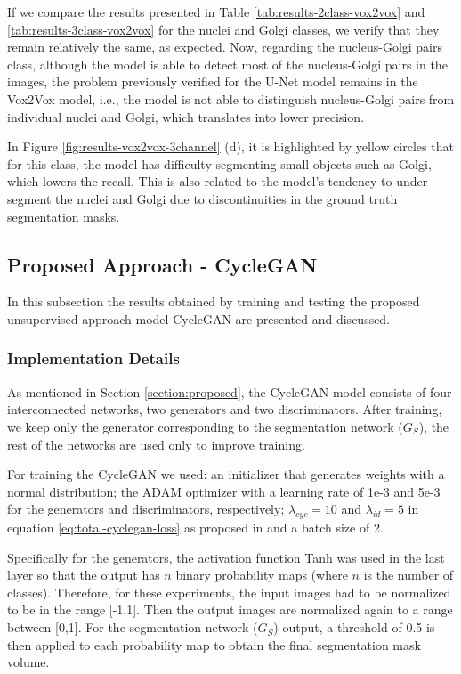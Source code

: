 If we compare the results presented in Table \ref{tab:results-2class-vox2vox} and \ref{tab:results-3class-vox2vox} for the nuclei and Golgi classes, we verify that they remain relatively the same, as expected. Now, regarding the nucleus-Golgi pairs class, although the model is able to detect most of the nucleus-Golgi pairs in the images, the problem previously verified for the U-Net model remains in the Vox2Vox model, i.e., the model is not able to distinguish nucleus-Golgi pairs from individual nuclei and Golgi, which translates into lower precision. 

In Figure \ref{fig:results-vox2vox-3channel} (d), it is highlighted by yellow circles that for this class, the model has difficulty segmenting small objects such as Golgi, which lowers the recall. This is also related to the model's tendency to under-segment the nuclei and Golgi due to discontinuities in the ground truth segmentation masks.


\subsection{Proposed Approach - CycleGAN}

In this subsection the results obtained by training and testing the proposed unsupervised approach model CycleGAN are presented and discussed.

\subsubsection*{Implementation Details}

As mentioned in Section \ref{section:proposed}, the CycleGAN model consists of four interconnected networks, two generators and two discriminators. After training, we keep only the generator corresponding to the segmentation network ($G_S$), the rest of the networks are used only to improve training. 

For training the CycleGAN we used: an initializer that generates weights with a normal distribution; the ADAM optimizer with a learning rate of 1e-3 and 5e-3 for the generators and discriminators, respectively; $\lambda_{cyc} = 10$ and $\lambda_{id} = 5$ in equation \ref{eq:total-cyclegan-loss} as proposed in \cite{cycleGAN:original} and a batch size of 2.

Specifically for the generators, the activation function \ac{Tanh} was used in the last layer so that the output has $n$ binary probability maps (where $n$ is the number of classes). Therefore, for these experiments, the input images had to be normalized to be in the range [-1,1]. Then the output images are normalized again to a range between [0,1]. For the segmentation network ($G_S$) output, a threshold of 0.5 is then applied to each probability map to obtain the final segmentation mask volume.

